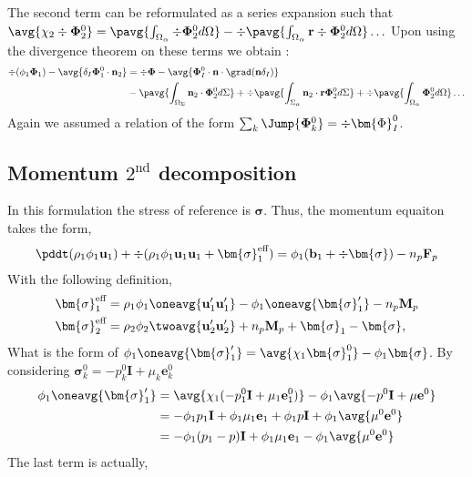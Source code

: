 The second term can be reformulated as a series expansion such that 
$\avg{ \chi_2 \div \mathbf{\Phi}_2^0  } = \pavg{\int_{\Omega_\alpha} \div \mathbf{\Phi}_2^0 d\Omega} - \div\pavg{\int_{\Omega_\alpha} \textbf{r} \div \mathbf{\Phi}_2^0 d\Omega} \ldots $
Upon using the divergence theorem on these terms we obtain :
\begin{align*}
    \div  (\phi_1 \mathbf{\Phi}_1)
    - \avg{\delta_I \mathbf{\Phi}_1^0 \cdot \textbf{n}_2}
    &=
    \div  \mathbf{\Phi}
    - \avg{ \mathbf{\Phi}_I^0  \cdot \textbf{n}\cdot\grad(\textbf{n} \delta_I)}\\
    &- \pavg{\int_{\Omega_\Sigma} \textbf{n}_2 \cdot \mathbf{\Phi}_2^0 d\Sigma} 
    + \div\pavg{\int_{\Sigma_\alpha}  \textbf{n}_2 \cdot \textbf{r}\mathbf{\Phi}_2^0 d\Sigma} 
    + \div\pavg{\int_{\Omega_\alpha}  \mathbf{\Phi}_2^0 d\Omega} \ldots
    \\
\end{align*}
Again we assumed a relation of the form $\sum_k \Jump{\mathbf{\Phi}_k^0} = \div \bm{\Phi}_I^0$. 

\subsection{Momentum $2^\text{nd}$ decomposition}
In this formulation the stress of reference is $\bm{\sigma}$.
Thus, the momentum equaiton takes the form,
\begin{align*}
    \pddt (\rho_1\phi_1 \textbf{u}_1 )
    + \div (\rho_1\phi_1 \textbf{u}_1  \textbf{u}_1
    + \bm{\sigma}^\text{eff}_1 )
    &= 
    \phi_1( \textbf{b}_1  +\div  \bm{\sigma})
    - n_p\textbf{F}_p \\
\end{align*}
With the following definition, 
\begin{align*}
    \bm{\sigma}^\text{eff}_1
    &=\rho_1 \phi_1 \oneavg{\textbf{u}_1'\textbf{u}_1'}
    - \phi_1 \oneavg{\bm{\sigma}_1'}
    - n_p\textbf{M}_p 
    \\
    \bm{\sigma}^\text{eff}_2
    &= \rho_2\phi_2 \twoavg{ \textbf{u}_2'\textbf{u}_2'} 
    + n_p\textbf{M}_p 
    +\bm{\sigma}_1 - \bm{\sigma},
\end{align*}
What is the form of 
$\phi_1 \oneavg{\bm{\sigma}_1'}
 = \avg{\chi_1 \bm{\sigma}_1^0}
 - \phi_1\bm{\sigma}
$. 
By considering $\bm{\sigma}_k^0 = -p_k^0 \textbf{I} + \mu_k \textbf{e}_k^0$
\begin{align*}
    \phi_1 \oneavg{\bm{\sigma}_1'}
 &= \avg{\chi_1 (-p_1^0 \textbf{I} + \mu_1 \textbf{e}_1^0)}
 - \phi_1\avg{-p^0 \textbf{I} + \mu \textbf{e}^0}\\
 &=  - \phi_1 p_1 \textbf{I} + \phi_1 \mu_1 \textbf{e}_1
 + \phi_1 p \textbf{I} + \phi_1 \avg{\mu^0 \textbf{e}^0}\\
 &=  - \phi_1 (p_1 - p) \textbf{I} 
 + \phi_1 \mu_1 \textbf{e}_1 
 - \phi_1 \avg{\mu^0 \textbf{e}^0}
\end{align*}
The last term is actually, 


